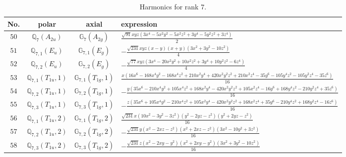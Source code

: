\documentclass[fleqn,8pt,landscape]{jsarticle}
\begin{document}
\begin{table}[ht!]
\begin{center}
\caption{Harmonics for rank 7.}
\renewcommand{\arraystretch}{1.3}
\begin{tabular}{cccl} \hline \hline
No. & polar & axial & expression \\ \hline
$ 50 $ & $ \mathbb{Q}_{7}(A_{2u}) $ & $ \mathbb{G}_{7}(A_{2g}) $ & $ \frac{\sqrt{91} x y z \left(3 x^{4} - 5 x^{2} y^{2} - 5 x^{2} z^{2} + 3 y^{4} - 5 y^{2} z^{2} + 3 z^{4}\right)}{2} $ \\
$ 51 $ & $ \mathbb{Q}_{7,1}(E_{u}) $ & $ \mathbb{G}_{7,1}(E_{g}) $ & $ - \frac{\sqrt{231} x y z \left(x - y\right) \left(x + y\right) \left(3 x^{2} + 3 y^{2} - 10 z^{2}\right)}{4} $ \\
$ 52 $ & $ \mathbb{Q}_{7,2}(E_{u}) $ & $ \mathbb{G}_{7,2}(E_{g}) $ & $ - \frac{\sqrt{77} x y z \left(3 x^{4} - 20 x^{2} y^{2} + 10 x^{2} z^{2} + 3 y^{4} + 10 y^{2} z^{2} - 6 z^{4}\right)}{4} $ \\
$ 53 $ & $ \mathbb{Q}_{7,1}(T_{1u},1) $ & $ \mathbb{G}_{7,1}(T_{1g},1) $ & $ \frac{x \left(16 x^{6} - 168 x^{4} y^{2} - 168 x^{4} z^{2} + 210 x^{2} y^{4} + 420 x^{2} y^{2} z^{2} + 210 x^{2} z^{4} - 35 y^{6} - 105 y^{4} z^{2} - 105 y^{2} z^{4} - 35 z^{6}\right)}{16} $ \\
$ 54 $ & $ \mathbb{Q}_{7,2}(T_{1u},1) $ & $ \mathbb{G}_{7,2}(T_{1g},1) $ & $ - \frac{y \left(35 x^{6} - 210 x^{4} y^{2} + 105 x^{4} z^{2} + 168 x^{2} y^{4} - 420 x^{2} y^{2} z^{2} + 105 x^{2} z^{4} - 16 y^{6} + 168 y^{4} z^{2} - 210 y^{2} z^{4} + 35 z^{6}\right)}{16} $ \\
$ 55 $ & $ \mathbb{Q}_{7,3}(T_{1u},1) $ & $ \mathbb{G}_{7,3}(T_{1g},1) $ & $ - \frac{z \left(35 x^{6} + 105 x^{4} y^{2} - 210 x^{4} z^{2} + 105 x^{2} y^{4} - 420 x^{2} y^{2} z^{2} + 168 x^{2} z^{4} + 35 y^{6} - 210 y^{4} z^{2} + 168 y^{2} z^{4} - 16 z^{6}\right)}{16} $ \\
$ 56 $ & $ \mathbb{Q}_{7,1}(T_{1u},2) $ & $ \mathbb{G}_{7,1}(T_{1g},2) $ & $ \frac{\sqrt{231} x \left(10 x^{2} - 3 y^{2} - 3 z^{2}\right) \left(y^{2} - 2 y z - z^{2}\right) \left(y^{2} + 2 y z - z^{2}\right)}{16} $ \\
$ 57 $ & $ \mathbb{Q}_{7,2}(T_{1u},2) $ & $ \mathbb{G}_{7,2}(T_{1g},2) $ & $ - \frac{\sqrt{231} y \left(x^{2} - 2 x z - z^{2}\right) \left(x^{2} + 2 x z - z^{2}\right) \left(3 x^{2} - 10 y^{2} + 3 z^{2}\right)}{16} $ \\
$ 58 $ & $ \mathbb{Q}_{7,3}(T_{1u},2) $ & $ \mathbb{G}_{7,3}(T_{1g},2) $ & $ - \frac{\sqrt{231} z \left(x^{2} - 2 x y - y^{2}\right) \left(x^{2} + 2 x y - y^{2}\right) \left(3 x^{2} + 3 y^{2} - 10 z^{2}\right)}{16} $ \\

\end{tabular}
\end{center}
\end{table}
\end{document}
